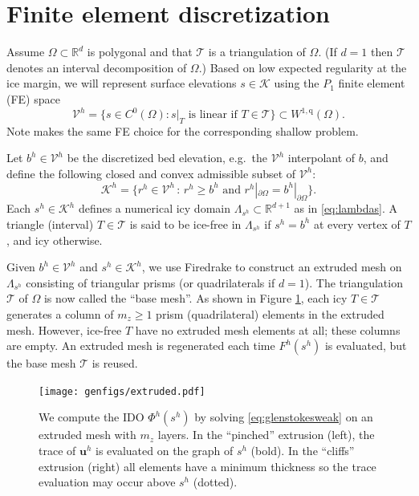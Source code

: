 \documentclass[letterpaper,final,12pt,reqno]{amsart}
\theoremstyle{claim}
\newcommand{\RR}{\mathbb{R}}
\newcommand{\bu}{\mathbf{u}}
\newcommand{\qq}{{\text{q}}}
\numberwithin{equation}{section}
\numberwithin{figure}{section}
\numberwithin{table}{section}
\numberwithin{theorem}{section}
\begin{document}
\section{Finite element discretization} \label{sec:fe}

Assume $\Omega \subset \RR^d$ is polygonal and that $\mathcal{T}$ is a triangulation of $\Omega$.  (If $d=1$ then $\mathcal{T}$ denotes an interval decomposition of $\Omega$.)  Based on low expected regularity at the ice margin, we will represent surface elevations $s\in \mathcal{K}$ using the $P_1$ finite element (FE) space
\begin{equation}
\mathcal{V}^h = \{s \in C^0(\Omega) : s|_T \text{ is linear if } T \in \mathcal{T}\} \subset W^{1,\qq}(\Omega).
\end{equation}
Note \cite{JouvetBueler2012} makes the same FE choice for the corresponding shallow problem.

Let $b^h \in \mathcal{V}^h$ be the discretized bed elevation, e.g.~the $\mathcal{V}^h$ interpolant of $b$, and define the following closed and convex admissible subset of $\mathcal{V}^h$:
\begin{equation}
\mathcal{K}^h = \{r^h \in \mathcal{V}^h \,:\, r^h \ge b^h \text{ and } r^h|_{\partial\Omega} = b^h|_{\partial\Omega}\}.  \label{eq:feK}
\end{equation}
Each $s^h\in \mathcal{K}^h$ defines a numerical icy domain $\Lambda_{s^h} \subset \RR^{d+1}$ as in \eqref{eq:lambdas}.  A triangle (interval) $T\in\mathcal{T}$ is said to be ice-free in $\Lambda_{s^h}$ if $s^h=b^h$ at every vertex of $T$, and icy otherwise.

Given $b^h \in \mathcal{V}^h$ and $s^h \in \mathcal{K}^h$, we use Firedrake to construct an extruded mesh \cite{McRaeetal2016} on $\Lambda_{s^h}$ consisting of triangular prisms (or quadrilaterals if $d=1$).  The triangulation $\mathcal{T}$ of $\Omega$ is now called the ``base mesh''.  As shown in Figure \ref{fig:extruded}, each icy $T \in \mathcal{T}$ generates a column of $m_z \ge 1$ prism (quadrilateral) elements in the extruded mesh.  However, ice-free $T$ have no extruded mesh elements at all; these columns are empty.  An extruded mesh is regenerated each time $F^h(s^h)$ is evaluated, but the base mesh $\mathcal{T}$ is reused.

\begin{figure}[t]
\begin{center}
\texttt{[image: genfigs/extruded.pdf]}
\end{center}
\caption{We compute the IDO $\Phi^h(s^h)$ by solving \eqref{eq:glenstokesweak} on an extruded mesh with $m_z$ layers.  In the ``pinched'' extrusion (left), the trace of $\bu^h$ is evaluated on the graph of $s^h$ (bold).  In the ``cliffs'' extrusion (right) all elements have a minimum thickness so the trace evaluation may occur above $s^h$ (dotted).}
\label{fig:extruded}
\end{figure}
\end{document}
